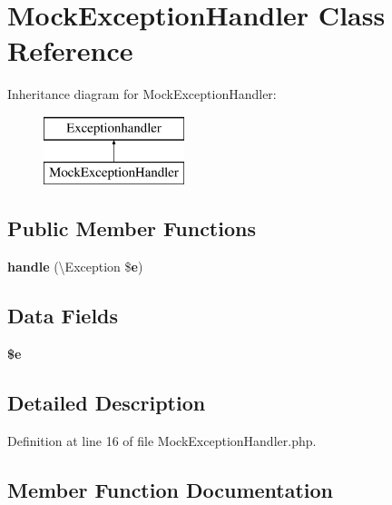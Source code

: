 \section{Mock\+Exception\+Handler Class Reference}
\label{class_symfony_1_1_component_1_1_debug_1_1_tests_1_1_mock_exception_handler}
Inheritance diagram for Mock\+Exception\+Handler\+:\begin{figure}[H]
\begin{center}
\leavevmode
\includegraphics[height=2.000000cm]{class_symfony_1_1_component_1_1_debug_1_1_tests_1_1_mock_exception_handler}
\end{center}
\end{figure}
\subsection*{Public Member Functions}
\begin{DoxyCompactItemize}
\item 
{\bf handle} (\textbackslash{}Exception \${\bf e})
\end{DoxyCompactItemize}
\subsection*{Data Fields}
\begin{DoxyCompactItemize}
\item 
{\bf \$e}
\end{DoxyCompactItemize}


\subsection{Detailed Description}


Definition at line 16 of file Mock\+Exception\+Handler.\+php.



\subsection{Member Function Documentation}
